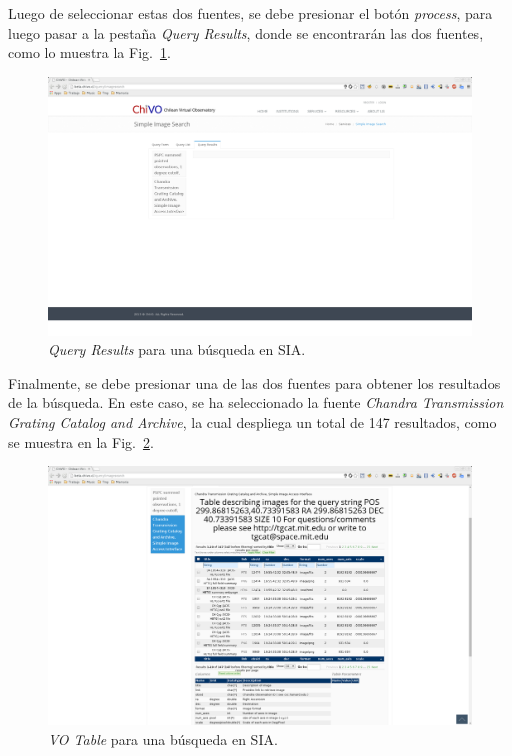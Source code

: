 Luego de seleccionar estas dos fuentes, se debe presionar el botón
\emph{process}, para luego pasar a la pestaña \emph{Query Results},
donde se encontrarán las dos fuentes, como lo muestra la
Fig.~\ref{img:qrsia}.

\begin{figure}[ht!]
    \begin{center}
	\includegraphics[scale=.2]{img/qrsia}
    \end{center}
    \caption{\emph{Query Results} para una búsqueda en SIA.}
    \label{img:qrsia}
\end{figure}

Finalmente, se debe presionar una de las dos fuentes para obtener los
resultados de la búsqueda. En este caso, se ha seleccionado la fuente
\emph{Chandra Transmission Grating Catalog and Archive}, la cual
despliega un total de 147 resultados, como se muestra en la
Fig.~\ref{img:qrsiavot}.

\begin{figure}[ht!]
    \begin{center}
	\includegraphics[scale=.2]{img/qrsiavot}
    \end{center}
    \caption{\emph{VO Table} para una búsqueda en SIA.}
    \label{img:qrsiavot}
\end{figure}


